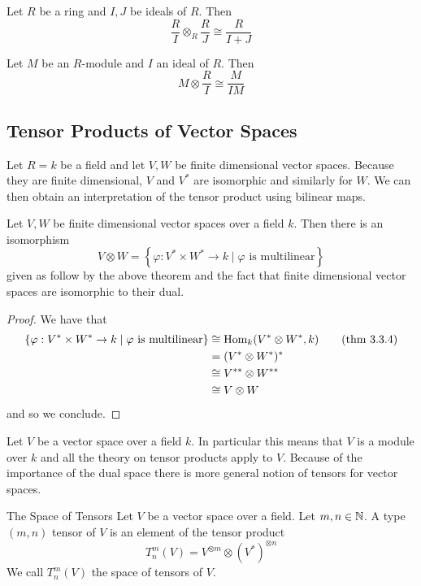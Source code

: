 \documentclass[a4paper]{article}
\begin{document}
\begin{prp}{}{} Let $R$ be a ring and $I,J$ be ideals of $R$. Then $$\frac{R}{I}\otimes_R\frac{R}{J}\cong\frac{R}{I+J}$$
\end{prp}

\begin{prp}{}{} Let $M$ be an $R$-module and $I$ an ideal of $R$. Then $$M\otimes\frac{R}{I}\cong\frac{M}{IM}$$
\end{prp}

\subsection{Tensor Products of Vector Spaces}
Let $R=k$ be a field and let $V,W$ be finite dimensional vector spaces. Because they are finite dimensional, $V$ and $V^\ast$ are isomorphic and similarly for $W$. We can then obtain an interpretation of the tensor product using bilinear maps. 

\begin{crl}{}{} Let $V,W$ be finite dimensional vector spaces over a field $k$. Then there is an isomorphism $$V\otimes W=\left\{\varphi:V^\ast\times W^\ast\to k\;|\;\varphi\text{ is multilinear}\right\}$$ given as follow by the above theorem and the fact that finite dimensional vector spaces are isomorphic to their dual. \tcbline
\begin{proof}
We have that 
\begin{align*}
\left\{\varphi:V^\ast\times W^\ast\to k\;|\;\varphi\text{ is multilinear}\right\}&\cong\operatorname{Hom}_k(V^\ast\otimes W^\ast,k)\tag{thm 3.3.4}\\
&=(V^\ast\otimes W^\ast)^\ast\\
&\cong V^{\ast\ast}\otimes W^{\ast\ast}\\
&\cong V\otimes W
\end{align*}
and so we conclude. 
\end{proof}
\end{crl}

Let $V$ be a vector space over a field $k$. In particular this means that $V$ is a module over $k$ and all the theory on tensor products apply to $V$. Because of the importance of the dual space there is more general notion of tensors for vector spaces. 

\begin{defn}{The Space of Tensors}{} Let $V$ be a vector space over a field. Let $m,n\in\mathbb{N}$. A type $(m,n)$ tensor of $V$ is an element of the tensor product $$T_n^m(V)=V^{\otimes m}\otimes(V^\ast)^{\otimes n}$$ We call $T_n^m(V)$ the space of tensors of $V$. 
\end{defn}
\end{document}
